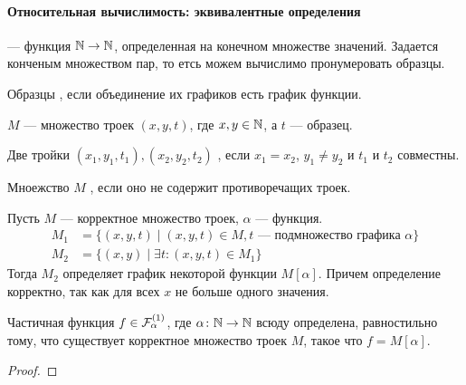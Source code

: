 \paragraph{Относительная вычислимость: эквивалентные определения}
\begin{defn}[Образец]
	 --- функция $ \mathbb{N} \to \mathbb{N}$, определенная на конечном множестве значений. Задается конченым множеством пар, то етсь  можем вычислимо пронумеровать образцы.
	
	\noindent
	Образцы , если объединение их графиков есть график функции.
\end{defn}
\begin{defn}[]
	$ M$ --- множество троек $ (x, y, t)$, где  $ x, y \in \mathbb{N}$, а $ t$ --- образец.

	\noindent
	Две тройки $ (x_1, y_1, t_1), (x_2, y_2, t_2)$ , если $  x_1= x_2$, $  y_1 \ne  y_2$ и $  t_1$ и $  t_2$ совместны.

	\noindent
	Мноежство $ M$ , если оно не содержит противоречащих троек.
\end{defn}
\begin{defn}
    Пусть  $  M$ --- корректное множество троек, $ \alpha $ --- функция.
	\[
	\begin{aligned}
		M_1& = \{(x, y, t) \mid (x, y, t) \in M, t \text{ --- подмножество графика } \alpha \} \\
		M_2&= \{(x, y) \mid \exists t\colon (x, y, t) \in M_1\}
	\end{aligned}
	\]
	Тогда $  M_2$ определяет график некоторой функции $ M[ \alpha ]$. Причем определение корректно, так как для всех $ x$ не больше одного значения.
\end{defn}
\begin{thm}
	Частичная функция $ f \in \mathcal{F}^{(1)}_{ \alpha }$, где $  \alpha \colon \mathbb{N} \to  \mathbb{N}$ всюду определена, равностильно тому, что существует корректное множество троек $ M$, такое что  $ f = M[ \alpha ]$.
\end{thm}
\begin{proof}
    
\end{proof}


